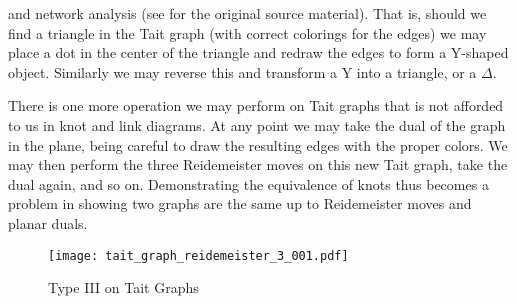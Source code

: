         and network analysis (see \cite{KennellyYDelta} for the original
        source material). That is, should we find a triangle in the Tait
        graph (with correct colorings for the edges) we may place a dot in the
        center of the triangle and redraw the edges to form a
        $\textrm{Y}$-shaped object. Similarly we may reverse this and transform
        a $\textrm{Y}$ into a triangle, or a $\Delta$.
        \par\hfill\par
        There is one more operation we may perform on Tait graphs that is not
        afforded to us in knot and link diagrams. At any point we may take the
        dual of the graph in the plane, being careful to draw the resulting
        edges with the proper colors. We may then perform the three
        Reidemeister moves on this new Tait graph, take the dual again, and
        so on. Demonstrating the equivalence of knots thus becomes a problem
        in showing two graphs are the same up to Reidemeister moves and planar
        duals.
        \begin{figure}
            \centering
            \texttt{[image: tait\_graph\_reidemeister\_3\_001.pdf]}
            \caption{Type III on Tait Graphs}
            \label{fig:tait_graph_reidemeister_3_001}
        \end{figure}
